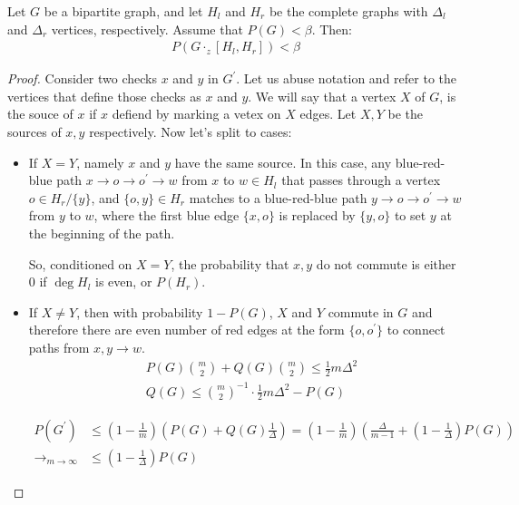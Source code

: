 \documentclass[manuscript,screen,review]{acmart}
\begin{document}
\begin{claim}  
Let $G$ be a bipartite graph, and let $H_{l}$ and $H_{r}$ be the complete graphs with $\Delta_{l}$ and $\Delta_{r}$ vertices, respectively. Assume that $P(G) < \beta$. Then:
\begin{equation*}
  \begin{split}
      P(G \cdot_{z} [H_{l},H_{r}]) < \beta
  \end{split}
\end{equation*}
\end{claim}
\begin{proof}
  Consider two checks $x$ and $y$ in $G^{\prime}$. Let us abuse notation and refer to the vertices that define those checks as $x$ and $y$. We will say that a vertex $X$ of $G$, is the souce of $x$ if $x$ defiend by marking a vetex on $X$ edges. Let $X,Y$ be the sources of $x,y$ respectively. Now let's split to cases:
  \begin{itemize}
    \item If $X = Y$, namely $x$ and $y$ have the same source. In this case, any blue-red-blue path $x \rightarrow o \rightarrow o^{\prime} \rightarrow w$ from $x$ to $w \in H_{l}$ that passes through a vertex $o \in H_{r}/\{y\}$, and $\{o,y\} \in H_{r}$ matches to a blue-red-blue path $y \rightarrow o \rightarrow o^{\prime} \rightarrow w$ from $y$ to $w$, where the first blue edge $\{ x, o \}$ is replaced by $\{ y, o \}$ to set $y$ at the beginning of the path.
   
    So, conditioned on $X=Y$, the probability that $x,y$ do not commute is either $0$ if $\deg H_{l}$ is even, or $P(H_{r})$.
  \item {} If $X\neq Y$, then with probability $1 - P(G)$, $X$ and $Y$ commute in $G$ and therefore there are even number of red edges at the form $\{o , o^{\prime}\}$ to connect paths from $x,y \rightarrow w$.     
    \begin{equation*}
      \begin{split}
        & P(G){ m \choose 2} + Q(G){ m \choose 2} \le \frac{1}{2}m \Delta^{2} \\ 
        & Q(G) \le { m \choose 2 }^{-1}\cdot \frac{1}{2}m\Delta^{2} - P(G)
      \end{split}
    \end{equation*}
    
    \begin{equation*}
      \begin{split}
        P(G^{\prime})  & \le \left( 1 - \frac{1}{m} \right) \left( P(G) + Q(G)  \frac{1}{\Delta} \right) = \left( 1 - \frac{1}{m} \right) \left(  \frac{\Delta}{m-1} + \left( 1 -  \frac{1}{\Delta}\right)P(G) \right) \\
       \rightarrow_{m \rightarrow \infty } & \le  \left(  1 - \frac{1}{\Delta} \right)P(G)
      \end{split}
    \end{equation*}

  \end{itemize}
\end{proof}
\end{document}
